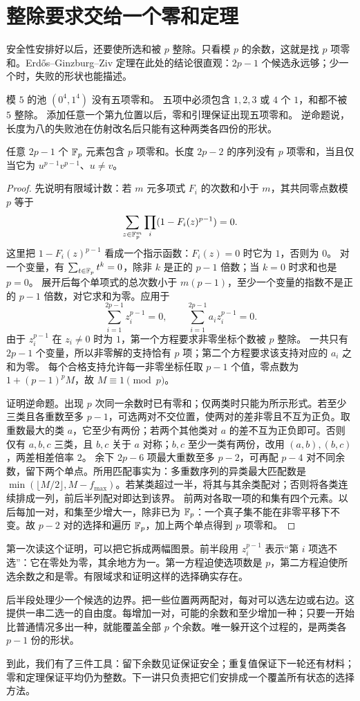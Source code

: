 \section{整除要求交给一个零和定理}
安全性安排好以后，还要使所选和被 $p$ 整除。只看模 $p$ 的余数，这就是找 $p$ 项零和。Erdős--Ginzburg--Ziv 定理在此处的结论很直观：$2p-1$ 个候选永远够；少一个时，失败的形状也能描述。
\begin{example}[五平均的边界池]
模 $5$ 的池 $(0^4,1^4)$ 没有五项零和。
五项中必须包含 $1,2,3$ 或 $4$ 个 $1$，和都不被 $5$ 整除。
添加任意一个第九位置以后，零和引理保证出现五项零和。
逆命题说，长度为八的失败池在仿射改名后只能有这种两类各四份的形状。
\end{example}
\begin{lemma}[素数零和选择及逆边界]\label{lem:egz}
任意 $2p-1$ 个 $\mathbb F_p$ 元素包含 $p$ 项零和。长度 $2p-2$ 的序列没有 $p$ 项零和，当且仅当它为 $u^{p-1}v^{p-1}$、$u\ne v$。
\end{lemma}
\begin{proof}
先说明有限域计数：若 $m$ 元多项式 $F_i$ 的次数和小于 $m$，其共同零点数模 $p$ 等于
\[\sum_{z\in\mathbb F_p^m}\prod_i(1-F_i(z)^{p-1})=0.
\]
这里把 $1-F_i(z)^{p-1}$ 看成一个指示函数：$F_i(z)=0$ 时它为 $1$，否则为 $0$。
对一个变量，有 $\sum_{t\in\mathbb F_p}t^k=0$，除非 $k$ 是正的 $p-1$ 倍数；当 $k=0$ 时求和也是 $p=0$。
展开后每个单项式的总次数小于 $m(p-1)$，至少一个变量的指数不是正的 $p-1$ 倍数，对它求和为零。应用于
\[\sum_{i=1}^{2p-1}z_i^{p-1}=0,\qquad
\sum_{i=1}^{2p-1}a_i z_i^{p-1}=0.
\]
由于 $z_i^{p-1}$ 在 $z_i\ne0$ 时为 $1$，第一个方程要求非零坐标个数被 $p$ 整除。
一共只有 $2p-1$ 个变量，所以非零解的支持恰有 $p$ 项；第二个方程要求该支持对应的 $a_i$ 之和为零。
每个合格支持允许每一非零坐标任取 $p-1$ 个值，零点数为 $1+(p-1)^p M$，故 $M\equiv1\pmod p$。

证明逆命题。出现 $p$ 次同一余数时已有零和；仅两类时只能为所示形式。若至少三类且各重数至多 $p-1$，可选两对不交位置，使两对的差非零且不互为正负。取重数最大的类 $a$，它至少有两份；若两个其他类对 $a$ 的差不互为正负即可。否则仅有 $a,b,c$ 三类，且 $b,c$ 关于 $a$ 对称；$b,c$ 至少一类有两份，改用 $(a,b),(b,c)$，两差相差倍率 $2$。
余下 $2p-6$ 项最大重数至多 $p-2$，可再配 $p-4$ 对不同余数，留下两个单点。所用匹配事实为：多重数序列的异类最大匹配数是 $\min(\lfloor M/2\rfloor,M-f_{\max})$。若某类超过一半，将其与其余类配对；否则将各类连续排成一列，前后半列配对即达到该界。
前两对各取一项的和集有四个元素。以后每加一对，和集至少增大一，除非已为 $\mathbb F_p$：一个真子集不能在非零平移下不变。故 $p-2$ 对的选择和遍历 $\mathbb F_p$，加上两个单点得到 $p$ 项零和。
\end{proof}

第一次读这个证明，可以把它拆成两幅图景。前半段用 $z_i^{p-1}$ 表示“第 $i$ 项选不选”：它在零处为零，其余地方为一。第一方程迫使选项数是 $p$，第二方程迫使所选余数之和是零。有限域求和证明这样的选择确实存在。

后半段处理少一个候选的边界。把一些位置两两配对，每对可以选左边或右边。这提供一串二选一的自由度。每增加一对，可能的余数和至少增加一种；只要一开始比普通情况多出一种，就能覆盖全部 $p$ 个余数。唯一躲开这个过程的，是两类各 $p-1$ 份的形状。

到此，我们有了三件工具：留下余数见证保证安全；重复值保证下一轮还有材料；零和定理保证平均仍为整数。下一讲只负责把它们安排成一个覆盖所有状态的选择方法。
